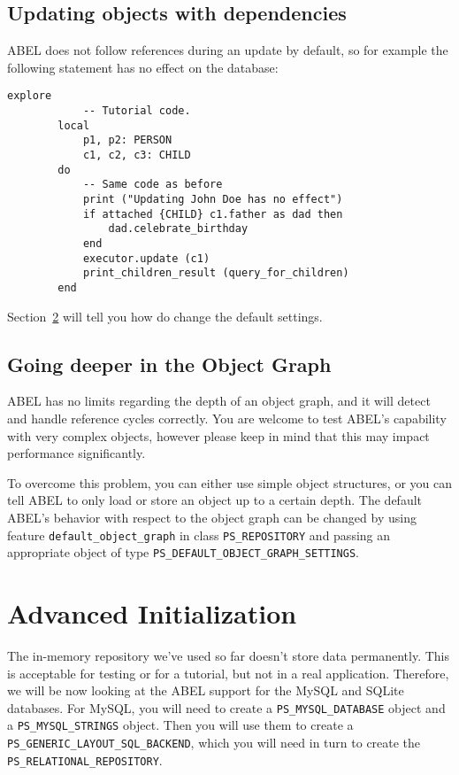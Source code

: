 \documentclass[a4paper,12pt]{report}
\begin{document}
\section{Updating objects with dependencies}
ABEL does not follow references during an update by default, so for example the following statement has no effect on the database:

\begin{lstlisting}[language=OOSC2Eiffel, captionpos=b, caption={References are not followed by default during updates.}, label={lst:reference_update}]
	explore
			-- Tutorial code.
		local
			p1, p2: PERSON
			c1, c2, c3: CHILD
		do
			-- Same code as before
			print ("Updating John Doe has no effect")
			if attached {CHILD} c1.father as dad then
				dad.celebrate_birthday
			end
			executor.update (c1)
			print_children_result (query_for_children)
		end
\end{lstlisting}
Section~\ref{sec:going_deeper_in_object_graph} will tell you how do change the default settings.
 
\section{Going deeper in the Object Graph}
\label{sec:going_deeper_in_object_graph}
ABEL has no limits regarding the depth of an object graph, and it will detect and handle reference cycles correctly. 
You are welcome to test ABEL's capability with very complex objects, however please keep in mind that this may impact performance significantly.

To overcome this problem, you can either use simple object structures, or you can tell ABEL to only load or store an object up to a certain depth.
The default ABEL's behavior with respect to the object graph can be changed by using feature \lstinline{default_object_graph} in class \lstinline{PS_REPOSITORY} and passing an appropriate object of type \lstinline{PS_DEFAULT_OBJECT_GRAPH_SETTINGS}.

\chapter{Advanced Initialization}
\label{chapter:advanced_initialization}

The in-memory repository we've used so far doesn't store data permanently.
This is acceptable for testing or for a tutorial, but not in a real application.
Therefore, we will be now looking at the ABEL support for the MySQL and SQLite databases. For MySQL, you will need to create a \lstinline!PS_MYSQL_DATABASE! object and a \lstinline!PS_MYSQL_STRINGS! object.
Then you will use them to create a \lstinline!PS_GENERIC_LAYOUT_SQL_BACKEND!, which you will need in turn to create the \lstinline!PS_RELATIONAL_REPOSITORY!.
\end{document}
